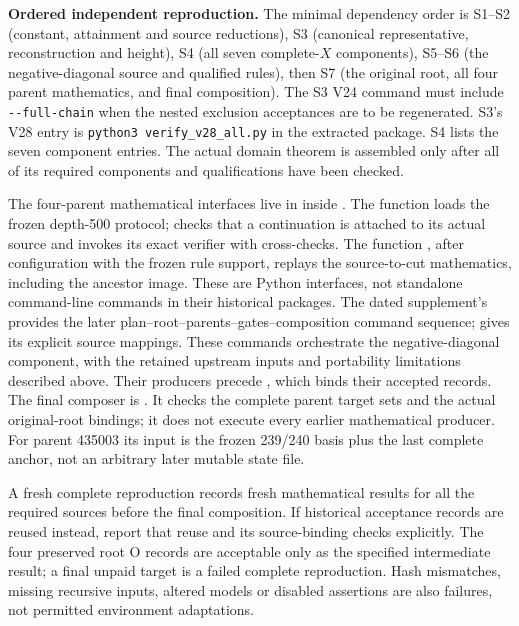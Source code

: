 \documentclass[10pt]{article}
\begin{document}
\textbf{Ordered independent reproduction.}
The minimal dependency order is S1--S2 (constant, attainment and source
reductions), S3 (canonical representative, reconstruction and height),
S4 (all seven complete-\(X\) components), S5--S6 (the negative-diagonal
source and qualified rules), then S7 (the original root, all four
parent mathematics, and final composition). The S3 V24 command must
include \verb|--full-chain| when the nested exclusion acceptances are
to be regenerated. S3's V28 entry is \texttt{python3 verify\_v28\_all.py}
in the extracted  package. S4 lists the seven
component entries. The actual domain theorem is assembled only after
all of its required components and qualifications have been checked.

The four-parent mathematical interfaces live in
 inside
. The function
 loads the frozen depth-500 protocol;
 checks that a continuation is attached
to its actual source and invokes its exact verifier with cross-checks.
The function , after configuration with
the frozen rule support, replays the source-to-cut mathematics,
including the ancestor image. These are Python interfaces, not
standalone command-line commands in their historical packages.
The dated supplement's 
provides the later plan--root--parents--gates--composition command sequence;
 gives its explicit source mappings.
These commands orchestrate the negative-diagonal component, with the
retained upstream inputs and portability limitations described above.
Their producers precede
, which binds their accepted records.
The final composer is
.
It checks the complete parent target sets and the actual original-root
bindings; it does not execute every earlier mathematical producer.
For parent 435003 its input is the frozen 239/240 basis plus the
last complete anchor, not an arbitrary later mutable state file.

A fresh complete reproduction records fresh mathematical results for
all the required sources before the final composition. If historical
acceptance records are reused instead, report that reuse and its
source-binding checks explicitly. The four preserved root O records
are acceptable only as the specified intermediate result; a final
unpaid target is a failed complete reproduction. Hash mismatches,
missing recursive inputs, altered models or disabled assertions are
also failures, not permitted environment adaptations.
\end{document}
